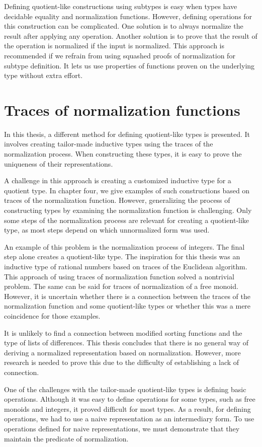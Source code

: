 Defining quotient-like constructions using subtypes is easy when types have decidable equality and normalization functions. However, defining operations for this construction can be complicated. One solution is to always normalize the result after applying any operation. Another solution is to prove that the result of the operation is normalized if the input is normalized. This approach is recommended if we refrain from using squashed proofs of normalization for subtype definition. It lets us use properties of functions proven on the underlying type without extra effort.
\section{Traces of normalization functions}
In this thesis, a different method for defining quotient-like types is presented. It involves creating tailor-made inductive types using the traces of the normalization process. When constructing these types, it is easy to prove the uniqueness of their representations.

A challenge in this approach is creating a customized inductive type for a quotient type. In chapter four, we give examples of such constructions based on traces of the normalization function. However, generalizing the process of constructing types by examining the normalization function is challenging. Only some steps of the normalization process are relevant for creating a quotient-like type, as most steps depend on which unnormalized form was used.

An example of this problem is the normalization process of integers. The final step alone creates a quotient-like type. The inspiration for this thesis was an inductive type of rational numbers based on traces of the Euclidean algorithm. This approach of using traces of normalization function solved a nontrivial problem. The same can be said for traces of normalization of a free monoid. However, it is uncertain whether there is a connection between the traces of the normalization function and some quotient-like types or whether this was a mere coincidence for those examples.

It is unlikely to find a connection between modified sorting functions and the type of lists of differences. This thesis concludes that there is no general way of deriving a normalized representation based on normalization. However, more research is needed to prove this due to the difficulty of establishing a lack of connection.

One of the challenges with the tailor-made quotient-like types is defining basic operations. Although it was easy to define operations for some types, such as free monoids and integers, it proved difficult for most types. As a result, for defining operations, we had to use a naive representation as an intermediary form. To use operations defined for naive representations, we must demonstrate that they maintain the predicate of normalization.

